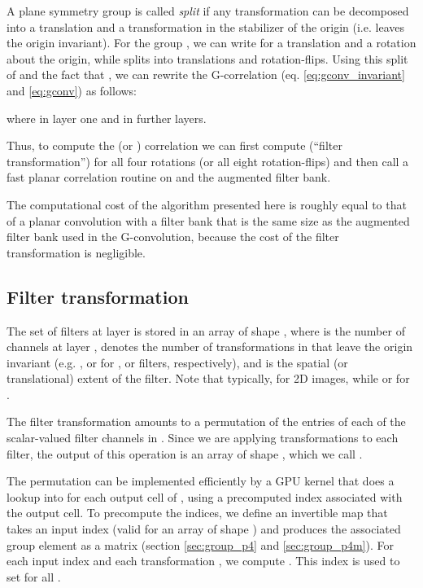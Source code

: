 \documentclass{article}
\begin{document}
A plane symmetry group  is called \emph{split} if any transformation  can be decomposed into a translation  and a transformation  in the stabilizer of the origin (i.e.  leaves the origin invariant).
For the group , we can write  for  a translation and  a rotation about the origin, while  splits into translations and rotation-flips.
Using this split of  and the fact that , we can rewrite the G-correlation (eq. \ref{eq:gconv_invariant} and \ref{eq:gconv}) as follows:

where  in layer one and  in further layers.

Thus, to compute the  (or ) correlation  we can first compute  (``filter transformation'') for all four rotations (or all eight rotation-flips) and then call a fast planar correlation routine on  and the augmented filter bank.

The computational cost of the algorithm presented here is roughly equal to that of a planar convolution with a filter bank that is the same size as the augmented filter bank used in the G-convolution, because the cost of the filter transformation is negligible.


\subsection{Filter transformation}

The set of filters at layer  is stored in an array  of shape , where  is the number of channels at layer ,  denotes the number of transformations in  that leave the origin invariant (e.g. ,  or  for ,  or  filters, respectively), and  is the spatial (or translational) extent of the filter.
Note that typically,  for 2D images, while  or  for .

The filter transformation  amounts to a permutation of the entries of each of the  scalar-valued filter channels in .
Since we are applying  transformations to each filter, the output of this operation is an array of shape , which we call .

The permutation can be implemented efficiently by a GPU kernel that does a lookup into  for each output cell of , using a precomputed index associated with the output cell.
To precompute the indices, we define an invertible map  that takes an input index (valid for an array of shape ) and produces the associated group element  as a matrix (section \ref{sec:group_p4} and \ref{sec:group_p4m}).
For each input index  and each transformation , we compute .
This index is used to set  for all .
\end{document}
